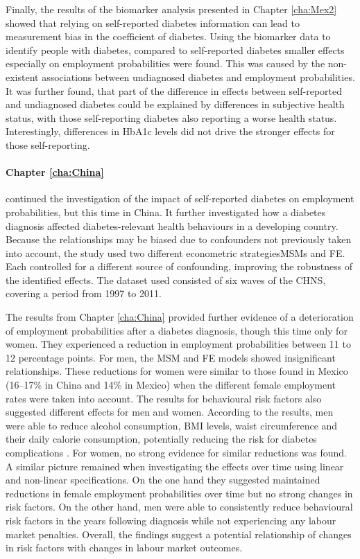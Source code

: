 Finally, the results of the biomarker analysis presented in Chapter \ref{cha:Mex2} showed that relying on self-reported diabetes information can lead to measurement bias in the coefficient of diabetes. Using the biomarker data to identify people with diabetes, compared to self-reported diabetes smaller effects especially on employment probabilities were found. This was caused by the non-existent associations between undiagnosed diabetes and employment probabilities. It was further found, that part of the difference in effects between self-reported and undiagnosed diabetes could be explained by differences in subjective health status, with those self-reporting diabetes also reporting a worse health status. Interestingly, differences in \ac{HbA1c} levels did not drive the stronger effects for those self-reporting. %


\paragraph{Chapter \ref{cha:China}} continued the investigation of the impact of self-reported diabetes on employment probabilities, but this time in China. It further investigated how a diabetes diagnosis affected diabetes-relevant health behaviours in a developing country. Because the relationships may be biased due to confounders not previously taken into account, the study used two different econometric strategies\DIFdelbegin {}\DIFdelend \DIFaddbegin \DIFadd{: }\DIFaddend \acp{MSM} and \ac{FE}. Each controlled for a different source of confounding, improving the robustness of the identified effects. The dataset used consisted of six waves of the \ac{CHNS}, covering a period from 1997 to 2011.

The results from Chapter \ref{cha:China} provided further evidence of a deterioration of employment probabilities after a diabetes diagnosis, though this time only for women. They experienced a reduction in employment probabilities between 11 to 12 percentage points. For men, the \ac{MSM} and \ac{FE} models showed insignificant relationships. These reductions for women were similar to those found in Mexico (16--17\% in China and 14\% in Mexico) when the different female employment rates were taken into account. The results for behavioural risk factors also suggested different effects for men and women. According to the results, men were able to reduce alcohol consumption, \ac{BMI} levels, waist circumference and their daily calorie consumption, potentially reducing the risk for diabetes complications \parencite{Wilding2014}. For women, no strong evidence for similar reductions was found. A similar picture remained when investigating the effects over time using linear and non-linear specifications. On the one hand they suggested maintained reductions in female employment probabilities over time but no strong changes in risk factors. On the other hand, men were able to consistently reduce behavioural risk factors in the years following diagnosis while not experiencing any labour market penalties. Overall, the findings suggest a potential relationship of changes in risk factors with changes in labour market outcomes.

